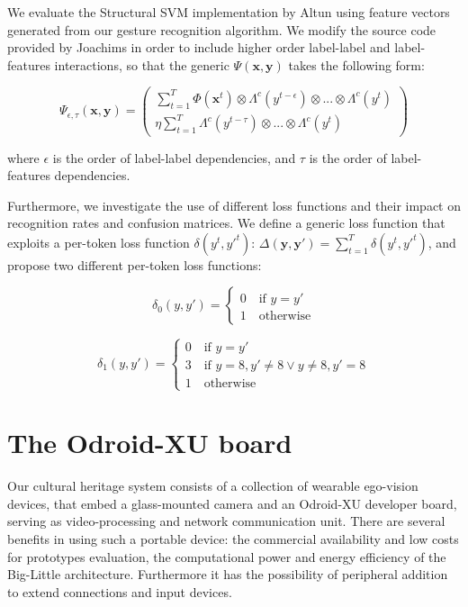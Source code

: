 We evaluate the Structural SVM implementation by Altun \etal using feature vectors generated from our gesture recognition algorithm. We modify the source code provided by Joachims \cite{joachims} in order to include higher order label-label and label-features interactions, so that the generic 
$\Psi(\mathbf{x},\mathbf{y})$ takes the following form:

\begin{equation}
\Psi_{\epsilon,\tau}(\mathbf{x},\mathbf{y}) = \left( \begin{array}{cc} \sum_{t=1}^T \Phi(\mathbf{x}^t) \otimes  \Lambda^c(y^{t-\epsilon}) \otimes ... \otimes \Lambda^c(y^t) \\ \eta\sum_{t=1}^{T}  \Lambda^c(y^{t-\tau}) \otimes ... \otimes \Lambda^c(y^t) \end{array} \right)
\end{equation}

where $\epsilon$ is the order of label-label dependencies, and $\tau$ is the order of label-features dependencies.

Furthermore, we investigate the use of different loss functions and their impact on recognition rates and confusion matrices. We define a generic loss function that exploits a per-token loss function $\delta(y^t,y'^t)$: $\Delta(\mathbf{y},\mathbf{y'}) = \sum_{t=1}^T \delta(y^t,y'^t)$, and propose two different per-token loss functions:

\begin{equation}
\delta_0(y,y') = \begin{cases} 0 \quad \text{if } y= y'  \\ 
1 \quad \text{otherwise}\end{cases}
\end{equation}

\begin{equation}
\delta_1(y,y') = \begin{cases} 0 \quad \text{if } y= y'  \\ 
3 \quad \text{if } y=8, y' \neq 8 \lor y\neq8, y'=8  \\
1 \quad \text{otherwise}\end{cases}
\end{equation}

\section{The Odroid-XU board}
Our cultural heritage system consists of a collection of wearable ego-vision devices, that embed a glass-mounted camera and an Odroid-XU developer board, serving as video-processing and network communication unit.
There are several benefits in using such a portable device: the commercial availability and low costs for prototypes evaluation, the computational power and energy efficiency of the Big-Little architecture. Furthermore it has the possibility  of peripheral addition to extend connections and input devices. 

